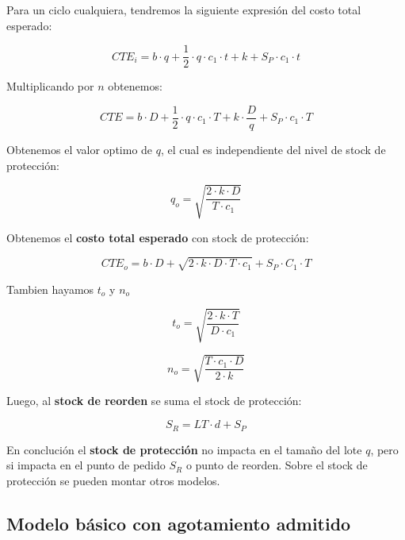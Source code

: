 \documentclass{article}
\begin{document}
Para un ciclo cualquiera, tendremos la siguiente expresión del costo total esperado:

\begin{equation}
    CTE_i= b \cdot q+\frac{1}{2} \cdot q \cdot c_1 \cdot t + k + S_P \cdot c_1 \cdot t
\end{equation}

Multiplicando por \(n\) obtenemos:

\begin{equation}
    CTE= b \cdot D +\frac{1}{2} \cdot q \cdot c_1 \cdot T + k \cdot \frac{D}{q} + S_P \cdot c_1 \cdot T
\end{equation}

Obtenemos el valor optimo de \(q\), el cual es independiente del nivel de stock de protección:

\begin{equation}
    q_o = \sqrt{\frac{2 \cdot k \cdot D}{T \cdot c_1}}
\end{equation}

Obtenemos el \textbf{costo total esperado} con stock de protección:

\begin{equation}
    CTE_o = b \cdot D + \sqrt{2 \cdot k \cdot D \cdot T \cdot c_1} + S_P \cdot C_1 \cdot T
\end{equation}

Tambien hayamos \(t_o\) y \(n_o\)

\begin{equation}
    t_o = \sqrt{\frac{2 \cdot k \cdot T}{D \cdot c_1}}
\end{equation}

\begin{equation}
    n_o = \sqrt{\frac{T \cdot c_1 \cdot D}{2 \cdot k}}
\end{equation}

Luego, al \textbf{stock de reorden} se suma el stock de protección:

\begin{equation}
    S_R = LT \cdot d + S_P
\end{equation}

En conclución el \textbf{stock de protección} no impacta en el tamaño del lote \(q\), pero si impacta en el punto de 
pedido \(S_R\) o punto de reorden. Sobre el stock de protección se pueden montar otros modelos. 

\newpage
\subsection{Modelo básico con agotamiento admitido}
\end{document}
